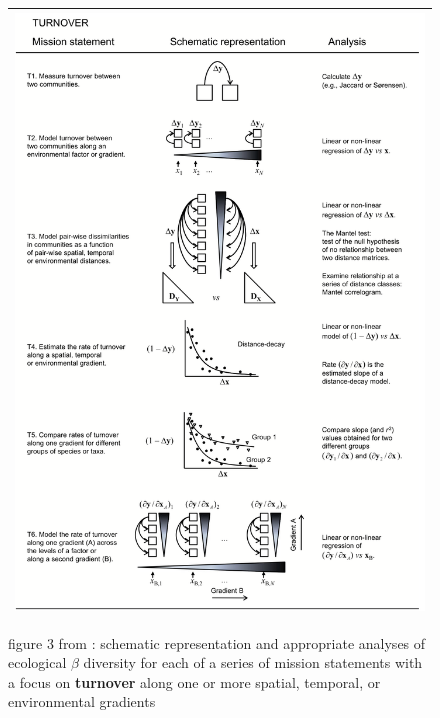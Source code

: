 \documentclass[references.tex]{subfiles}
\begin{document}
\begin{figure}[h!]
    \centering
    \begin{tabular}{c}
    \includegraphics[scale=0.65]{images/figures/AndCri2011/fig3.png}
    \\\hline
    \end{tabular}
    \caption{
        figure 3 from \citep{AndCri2011}: schematic representation and appropriate analyses of ecological $\beta$ diversity for each of a series of mission statements with a focus on \textbf{turnover} along one or more spatial, temporal, or environmental gradients
    }
\end{figure}
\end{document}
